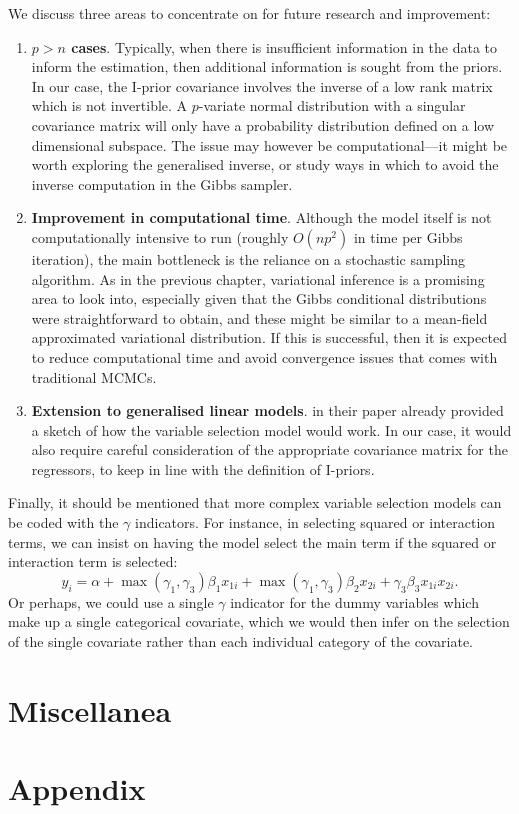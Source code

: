 \documentclass[a4paper,showframe,11pt]{report}
\begin{document}
We discuss three areas to concentrate on for future research and improvement:
\begin{enumerate}
  \item \textbf{\boldmath$p>n$ cases}. 
  Typically, when there is insufficient information in the data to inform the estimation, then additional information is sought from the priors. 
  In our case, the I-prior covariance involves the inverse of a low rank matrix which is not invertible.
  A $p$-variate normal distribution with a singular covariance matrix will only have a probability distribution defined on a low dimensional subspace.
  The issue may however be computational---it might be worth exploring the generalised inverse, or study ways in which to avoid the inverse computation in the Gibbs sampler.
  
  \item \textbf{Improvement in computational time}. 
  Although the model itself is not computationally intensive to run (roughly $O(np^2)$ in time per Gibbs iteration), the main bottleneck is the reliance on a stochastic sampling algorithm.
  As in the previous chapter, variational inference is a promising area to look into, especially given that the Gibbs conditional distributions were straightforward to obtain, and these might be similar to a mean-field approximated variational distribution.
  If this is successful, then it is expected to reduce computational time and avoid convergence issues that comes with traditional MCMCs.
  
  \item \textbf{Extension to generalised linear models}.
  \citet{Kuo1998} in their paper already provided a sketch of how the variable selection model would work.
  In our case, it would also require careful consideration of the appropriate covariance matrix for the regressors, to keep in line with the definition of I-priors.
\end{enumerate}

Finally, it should be mentioned that more complex variable selection models can be coded with the $\gamma$ indicators.
For instance, in selecting squared or interaction terms, we can insist on having the model select the main term if the squared or interaction term is selected:
\[
  y_i = \alpha + \max(\gamma_1,\gamma_3) \beta_1x_{1i} + \max(\gamma_1,\gamma_3) \beta_2 x_{2i} + \gamma_3 \beta_3 x_{1i}x_{2i}.
\]
Or perhaps, we could use a single $\gamma$ indicator for the dummy variables which make up a single categorical covariate, which we would then infer on the selection of the single covariate rather than each individual category of the covariate.

\section{Miscellanea}


\ifstandalone
  \section*{Appendix}
  
  
\fi

\hClosingStuffStandalone
\end{document}

